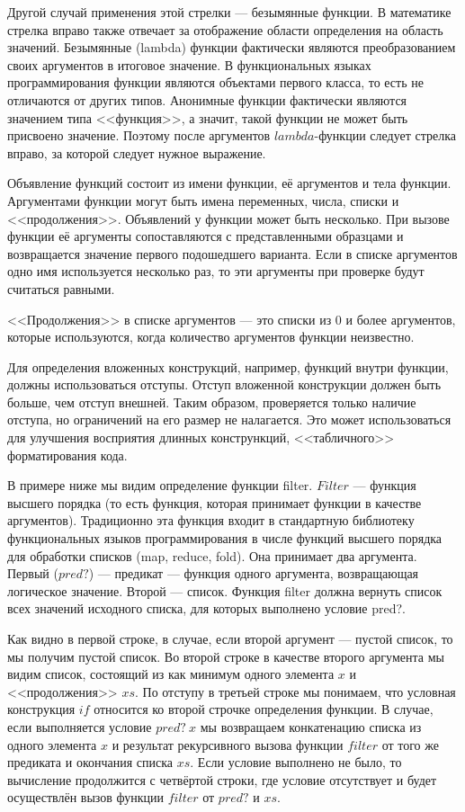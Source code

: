         Другой случай применения этой стрелки --- безымянные функции.
        В математике стрелка вправо также отвечает за отображение области определения на область значений.
        Безымянные (lambda) функции фактически являются преобразованием своих аргументов в итоговое значение.
        В функциональных языках программирования функции являются объектами первого класса, то есть не отличаются от других типов.
        Анонимные функции фактически являются значением типа <<функция>>, а значит, такой функции не может быть присвоено значение.
        Поэтому после аргументов $lambda$-функции следует стрелка вправо, за которой следует нужное выражение.

        Объявление функций состоит из имени функции, её аргументов и тела функции.
        Аргументами функции могут быть имена переменных, числа, списки и <<продолжения>>.
        Объявлений у функции может быть несколько.
        При вызове функции её аргументы сопоставляются с представленными образцами и возвращается значение первого подошедшего варианта.
        Если в списке аргументов одно имя используется несколько раз, то эти аргументы при проверке будут считаться равными.

        <<Продолжения>> в списке аргументов --- это списки из 0 и более аргументов, которые используются, когда количество аргументов функции неизвестно.

        Для определения вложенных конструкций, например, функций внутри функции, должны использоваться отступы.
        Отступ вложенной конструкции должен быть больше, чем отступ внешней.
        Таким образом, проверяется только наличие отступа, но ограничений на его размер не налагается.
        Это может использоваться для улучшения восприятия длинных констрункций, <<табличного>> форматирования кода.

        В примере ниже мы видим определение функции filter.
        $Filter$ --- функция высшего порядка (то есть функция, которая принимает функции в качестве аргументов).
        Традиционно эта функция входит в стандартную библиотеку функциональных языков программирования в числе функций высшего порядка для обработки списков (map, reduce, fold).
        Она принимает два аргумента.
        Первый ($pred?$) --- предикат --- функция одного аргумента, возвращающая логическое значение.
        Второй --- список.
        Функция filter должна вернуть список всех значений исходного списка, для которых выполнено условие pred?.

        Как видно в первой строке, в случае, если второй аргумент --- пустой список, то мы получим пустой список.
        Во второй строке в качестве второго аргумента мы видим список, состоящий из как минимум одного элемента $x$ и <<продолжения>> $xs$.
        По отступу в третьей строке мы понимаем, что условная конструкция $if$ относится ко второй строчке определения функции.
        В случае, если выполняется условие $pred?~x$ мы возвращаем конкатенацию списка из одного элемента $x$ и результат рекурсивного вызова функции $filter$ от того же предиката и окончания списка $xs$.
        Если условие выполнено не было, то вычисление продолжится с четвёртой строки, где условие отсутствует и будет осуществлён вызов функции $filter$ от $pred?$ и $xs$.


